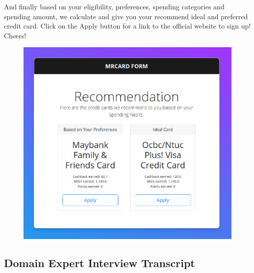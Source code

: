 		And finally based on your eligibility, preferences, spending categories and spending amount, we calculate and give you your recommend ideal and preferred credit card. Click on the Apply button for a link to the official website to sign up! Cheers!

		\begin{figure}[H]
			\centering
			\includegraphics[width=\linewidth]{img/recommendation_v2.png}
		\end{figure}


\clearpage{}

\subsection{Domain Expert Interview Transcript} %
\label{appendix:appendix_c}

